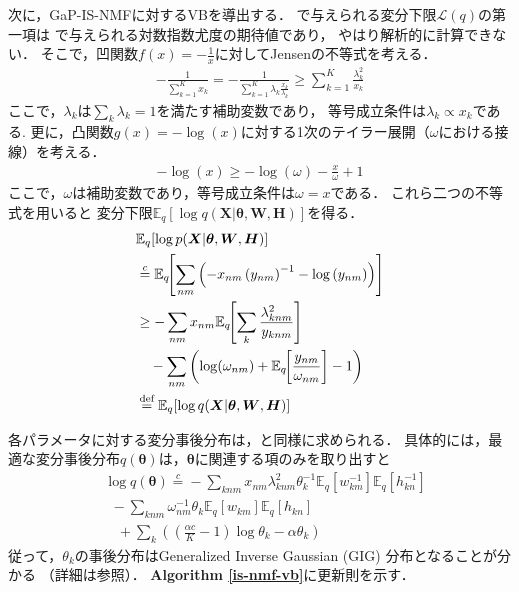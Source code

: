 次に，GaP-IS-NMFに対するVB\cite{hoffman:icml:2010}を導出する．
で与えられる変分下限$\mathcal{L}(q)$の第一項は
で与えられる対数指数尤度の期待値であり，
やはり解析的に計算できない．
そこで，凹関数$f(x) = - \frac{1}{x}$に対してJensenの不等式を考える．
\begin{align}
- \frac{1}{\sum_{k=1}^K x_k} 
= - \frac{1}{\sum_{k=1}^K \lambda_k \frac{x_k}{\lambda_k}} \ge \sum_{k=1}^K \frac{\lambda_k^2}{x_k}
\end{align}
ここで，$\lambda_k$は$\sum_k \lambda_k = 1$を満たす補助変数であり，
等号成立条件は$\lambda_k \propto x_k$である.
更に，凸関数$g(x) = - \log(x)$に対する1次のテイラー展開（$\omega$における接線）を考える．
\begin{align}
- \log (x) \ge - \log (\omega) - \frac{x}{\omega} + 1
\end{align}
ここで，$\omega$は補助変数であり，等号成立条件は$\omega = x$である．
これら二つの不等式を用いると
変分下限$\mathbb{E}_{q}[\log q(\bm{X}|\bm\theta,\bm{W},\bm{H})]$を得る．
\begin{align}
&
\mathbb{E}_{q}[\log p(\bm{X}|\bm\theta,\bm{W},\bm{H})]
\nonumber\\
&
\overset{c}{=} \mathbb{E}_{q}\!\!\left[\sum_{nm} 
\left(- x_{nm} \left(y_{nm}\right)^{-1} - \log \left(y_{nm}\right)\right)\right]
\nonumber\\
&
\ge - \sum_{nm} x_{nm} \mathbb{E}_{q}\!\!\left[\sum_k \frac{\lambda_{knm}^2}{y_{knm}}\right] 
\nonumber\\
&\ \ \
- \sum_{nm} \left(\log(\omega_{nm}) + \mathbb{E}_{q}\!\!\left[\frac{y_{nm}}{\omega_{nm}}\right] - 1\right)
\nonumber\\
&
\overset{\mbox{\scriptsize def}}{=} \mathbb{E}_{q}[\log q(\bm{X}|\bm\theta,\bm{W},\bm{H})]
\label{eqn:lb2_is}
\end{align}

各パラメータに対する変分事後分布は，と同様に求められる．
具体的には，最適な変分事後分布$q(\bm\theta)$は，$\bm\theta$に関連する項のみを取り出すと
\begin{align}
&
\log q(\bm\theta) 
\overset{c}{=} 
- \sum_{knm} x_{nm} \lambda_{knm}^2 \theta_k^{-1} \mathbb{E}_{q}\!\!\left[w_{km}^{-1}\right] \mathbb{E}_{q}\!\!\left[h_{kn}^{-1}\right] 
\nonumber\\
&\ \
- \sum_{knm} \omega_{nm}^{-1} \theta_k \mathbb{E}_{q}\!\left[w_{km}\right] \mathbb{E}_{q}\!\left[h_{kn}\right]
\nonumber\\
&\ \ \ \
+ \sum_{k} \left( \left(\frac{\alpha c}{K} - 1\right) \log \theta_k - \alpha \theta_k \right)
\end{align}
従って，$\theta_k$の事後分布はGeneralized Inverse Gaussian (GIG) 分布となることが分かる
（詳細は\cite{hoffman:icml:2010}参照）．
{\bf Algorithm \ref{is-nmf-vb}}に更新則を示す．

